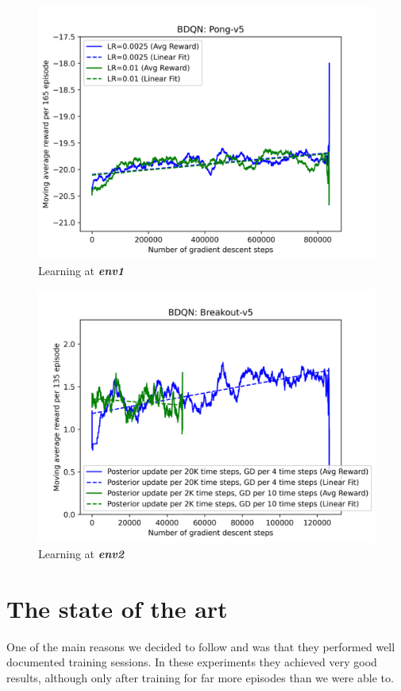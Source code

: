 \documentclass{article}
\begin{document}
\begin{figure} [ht]
    \centering
    \includegraphics[width=1\textwidth]{img/pong-v5_learning.png}
    \caption{Learning at \textbf{\textit{env1}}}
    \label{fig:pong_learning}
\end{figure}

\begin{figure} [ht]
    \centering
    \includegraphics[width=1\textwidth]{img/breakout-v5_learning.png}
    \caption{Learning at \textbf{\textit{env2}}}
    \label{fig:breakout_learning}
\end{figure}

\clearpage
\section{The state of the art}
One of the main reasons we decided to follow \cite{BDQN} and \cite{EEtBDQN} was that they performed well documented training sessions. In these experiments they achieved very good results, although only after training for far more episodes than we were able to.
\end{document}
